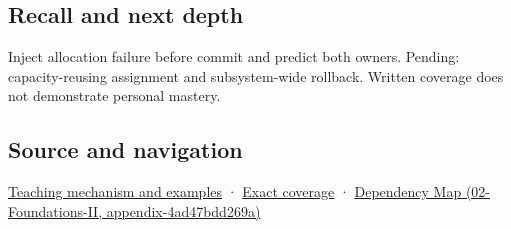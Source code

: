 \subsection{Recall and next depth}\label{recall-and-next-depth}

Inject allocation failure before commit and predict both owners. Pending: capacity-reusing assignment and subsystem-wide rollback. Written coverage does not demonstrate personal mastery.

\subsection{Source and navigation}\label{source-and-navigation}

\href{Continuous\%20Notes/Computing\%20Foundations\%20-\%20From\%20Bits\%20to\%20C++\%20and\%20Systems\%20APIs\#Replacing\%20a\%20value\%20is\%20not\%20creating\%20an\%20object}{Teaching mechanism and examples} · \hyperref[appendix-fd090d982a15]{Exact coverage} · \href{}{Dependency Map (02-Foundations-II, appendix-4ad47bdd269a)}

